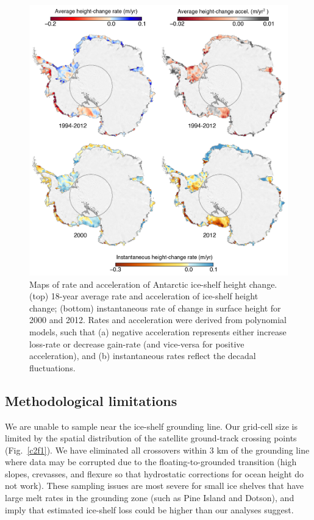 \begin{figure}[!hb]
  \centering
  \includegraphics[width=\textwidth]{img/map_4panels_v5.png}
  \caption[Maps of rate and acceleration of ice-shelf height change]{
  Maps of rate and acceleration of Antarctic ice-shelf height change. (top) 18-year average rate and acceleration of ice-shelf height change; (bottom) instantaneous rate of change in surface height for 2000 and 2012. Rates and acceleration were derived from polynomial models, such that (a) negative acceleration represents either increase loss-rate or decrease gain-rate (and vice-versa for positive acceleration), and (b) instantaneous rates reflect the decadal fluctuations.
  } 
  \label{c2f9}
\end{figure}


\subsection{Methodological limitations}

\noindent
We are unable to sample near the ice-shelf grounding line. Our grid-cell size is limited by the spatial distribution of the satellite ground-track crossing points (Fig.~\ref{c2f1}). We have eliminated all crossovers within 3 km of the grounding line where data may be corrupted due to the floating-to-grounded transition (high slopes, crevasses, and flexure so that hydrostatic corrections for ocean height do not work). These sampling issues are most severe for small ice shelves that have large melt rates in the grounding zone (such as Pine Island and Dotson), and imply that estimated ice-shelf loss could be higher than our analyses suggest.

